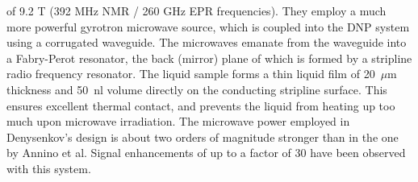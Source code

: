 of 9.2 T (392 MHz NMR / 260 GHz EPR frequencies). They employ a much
more powerful gyrotron microwave source, which is coupled into the DNP
system using a corrugated waveguide. The microwaves emanate from the
waveguide into a Fabry-Perot resonator, the back (mirror) plane of which
is formed by a stripline radio frequency resonator. The liquid sample
forms a thin liquid film of 20~$\mu$m thickness and 50~nl volume directly
on the conducting stripline surface. This ensures excellent thermal
contact, and prevents the liquid from heating up too much upon microwave
irradiation. The microwave power employed in Denysenkov's design is
about two orders of magnitude stronger than in the one by Annino et al.
Signal enhancements of up to a factor of 30 have been observed with this
system.
